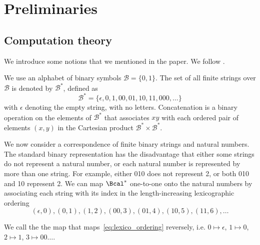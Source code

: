 \section{Preliminaries}\label{sec:Preliminaries}
\subsection{Computation theory}\label{sec:Computation}
We introduce some notions that we mentioned in the paper. We follow \cite{li2019introduction}.

We use an alphabet of binary symbols $\mathcal{B}=\{0,1\}$. The set of all finite strings over $\mathcal{B}$ is denoted by $\mathcal{B}^*$, defined as
\begin{equation}
    \mathcal{B}^*=\{\epsilon, 0,1,00,01,10,11,000, \ldots\}
\end{equation}
with $\epsilon$ denoting the empty string, with no letters. Concatenation is a binary operation on the elements of $\mathcal{B}^*$ that associates $x y$ with each ordered pair of elements $(x, y)$ in the Cartesian product $\mathcal{B}^* \times \mathcal{B}^*$. 

We now consider a correspondence of finite binary strings and natural numbers. The standard binary representation has the disadvantage that either some strings do not represent a natural number, or each natural number is represented by more than one string. For example, either 010 does not represent 2, or both 010 and 10 represent 2. We can map $\Bcal^*$ one-to-one onto the natural numbers by associating each string with its index in the length-increasing lexicographic ordering
\begin{equation}\label{eq:lexico_ordering}
    (\epsilon, 0), (0, 1), (1, 2), (00, 3), (01, 4), (10, 5), (11, 6), \dots
\end{equation}
\begin{definition}\label{def:binary_lexico_code}
    We call the  the map that maps~\cref{eq:lexico_ordering} reversely, i.e. $0\mapsto \epsilon$, $1\mapsto 0$, $2\mapsto 1$, $3\mapsto 00 \dots$.
\end{definition}

